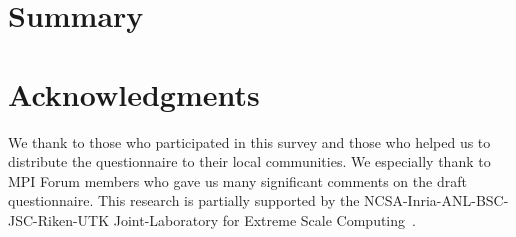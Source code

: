 \documentclass[conference,10pt,letterpaper]{IEEEtran}
\begin{document}
\section{Summary}

\section*{Acknowledgments}
We thank to those who participated in this survey and those who
helped us to distribute the questionnaire to their local
communities. We especially thank to MPI Forum members who gave us many
significant comments on the draft questionnaire.
This research is partially supported by the
NCSA-Inria-ANL-BSC-JSC-Riken-UTK Joint-Laboratory for Extreme Scale
Computing~\cite{JLESC}.



\end{document}
